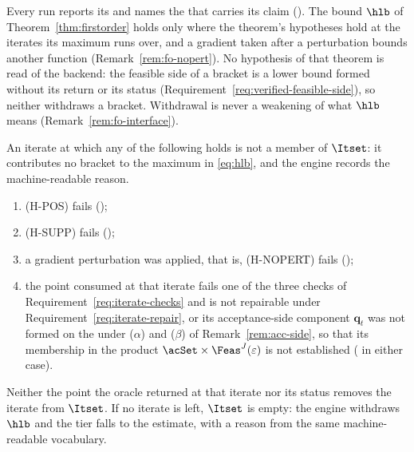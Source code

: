 
Every run reports its  and names the  that carries
its claim (). The  bound $\hlb$
of Theorem~\ref{thm:firstorder} holds only where the theorem's hypotheses
hold at the iterates its maximum runs over, and a gradient taken after a
perturbation bounds another function (Remark~\ref{rem:fo-nopert}).
No hypothesis of that theorem is read of the backend: the feasible side of
a bracket is a lower bound formed without its return or its status
(Requirement~\ref{req:verified-feasible-side}), so neither withdraws a
bracket. Withdrawal is never a weakening of what $\hlb$ means
(Remark~\ref{rem:fo-interface}).

\begin{requirement}\label{req:first-order-withdrawal}
An iterate at which any of the following holds is not a member of
$\Itset$: it contributes no bracket to the maximum in \eqref{eq:hlb}, and the
engine records the machine-readable reason.
\begin{enumerate}[label=(\roman*),leftmargin=2.4em]
\item (H-POS) fails ();
\item (H-SUPP) fails ();
\item a gradient perturbation was applied, that is, (H-NOPERT) fails
  ();
\item the point consumed at that iterate fails one of the three checks of
  Requirement~\ref{req:iterate-checks} and is not repairable under
  Requirement~\ref{req:iterate-repair}, or its acceptance-side component
  $\mathbf q_t$ was not formed on the  under ($\alpha$)
  and ($\beta$) of Remark~\ref{rem:acc-side}, so that its membership in the
  product $\acSet\times\Feas^{J}(\varepsilon)$ is not established
  ( in either case).
\end{enumerate}
Neither the point the oracle returned at that iterate nor its status
removes the iterate from $\Itset$.
If no iterate is left, $\Itset$ is empty: the engine withdraws $\hlb$ and
the tier falls to the estimate, with a reason from the same
machine-readable vocabulary.
\end{requirement}
